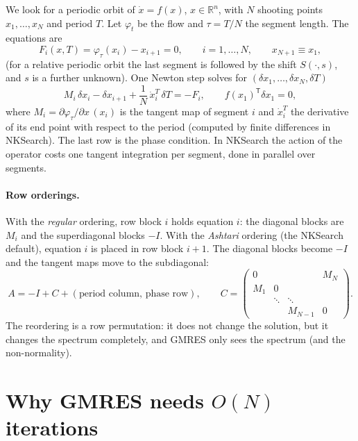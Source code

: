 \documentclass[11pt,a4paper]{article}
\newcommand{\R}{\mathbb{R}}
\newcommand{\tr}{^{\mathsf T}}
\begin{document}
We look for a periodic orbit of $\dot x = f(x)$, $x \in \R^n$, with $N$ shooting points $x_1,\dots,x_N$ and period $T$. Let $\varphi_t$ be the flow and $\tau = T/N$ the segment length. The equations are
\begin{equation}
F_i(x, T) = \varphi_{\tau}(x_i) - x_{i+1} = 0, \qquad i = 1,\dots,N, \qquad x_{N+1} \equiv x_1,
\end{equation}
(for a relative periodic orbit the last segment is followed by the shift $S(\cdot, s)$, and $s$ is a further unknown). One Newton step solves for $(\delta x_1,\dots,\delta x_N, \delta T)$
\begin{equation}
M_i\,\delta x_i - \delta x_{i+1} + \frac{1}{N}\,\dot x_i^{T}\,\delta T = -F_i, \qquad
f(x_1)\tr \delta x_1 = 0,
\label{eq:newton}
\end{equation}
where $M_i = \partial\varphi_\tau/\partial x\,(x_i)$ is the tangent map of segment $i$ and $\dot x_i^T$ the derivative of its end point with respect to the period (computed by finite differences in NKSearch). The last row is the phase condition. In NKSearch the action of the operator costs one tangent integration per segment, done in parallel over segments.

\paragraph{Row orderings.} With the \emph{regular} ordering, row block $i$ holds equation $i$: the diagonal blocks are $M_i$ and the superdiagonal blocks $-I$. With the \emph{Ashtari} ordering (the NKSearch default), equation $i$ is placed in row block $i+1$. The diagonal blocks become $-I$ and the tangent maps move to the subdiagonal:
\begin{equation}
A = -I + C + (\text{period column, phase row}), \qquad
C = \begin{pmatrix}
0 & & & M_N\\
M_1 & 0 & & \\
 & \ddots & \ddots & \\
 & & M_{N-1} & 0
\end{pmatrix}.
\label{eq:ashtari}
\end{equation}
The reordering is a row permutation: it does not change the solution, but it changes the spectrum completely, and GMRES only sees the spectrum (and the non-normality).

\section{Why GMRES needs $O(N)$ iterations}
\end{document}
